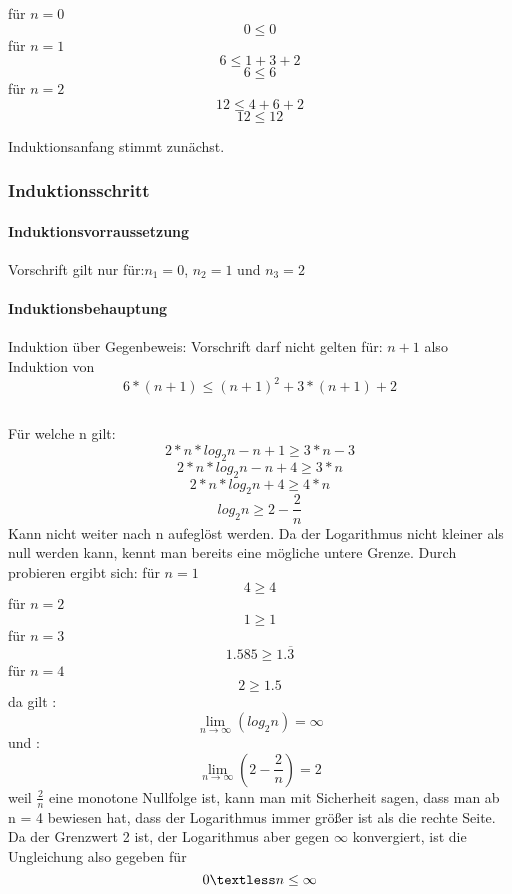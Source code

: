 \documentclass{article}
\begin{document}
für $n=0$
\[0 \le 0\]
für $n=1$
\[6 \le 1+3+2\]
\[ 6 \le 6 \]
\newline
für $n=2$
\[12 \le 4+6+2\]
\[ 12 \le 12 \]
\newline

Induktionsanfang stimmt zunächst.
\subsubsection{Induktionsschritt}
\paragraph{Induktionsvorraussetzung}\mbox{}

Vorschrift gilt nur für:$n_1=0$,  $n_2=1$ und  $n_3=2$

\paragraph{Induktionsbehauptung}\mbox{}
Induktion über Gegenbeweis:
Vorschrift darf nicht gelten für: $n+1$ also Induktion von \[6*(n+1) \le (n+1)^2+3*(n+1)+2\]
\subsection{}
Für welche n gilt:
\[2*n*log_2n-n+1 \geq 3*n-3 \]
\[2*n*log_2n-n+4 \geq 3*n \]
\[2*n*log_2n+4 \geq 4*n \]
\[log_2n \geq 2 - \frac{2}{n} \]
Kann nicht weiter nach n aufeglöst werden. Da der Logarithmus nicht kleiner als null werden kann, kennt man bereits eine
mögliche untere Grenze. Durch probieren ergibt sich:
\newline
für $n=1$ \[4 \geq 4 \]
für $n=2$ \[1 \geq 1 \]
für $n=3$ \[1.585 \geq  1.\overline{3} \]
für $n=4$ \[2 \geq  1.5 \]
da gilt :\[\lim_{n\to\infty}\left(log_2n\right)=\infty\]
und 
:\[\lim_{n\to\infty}\left(2 - \frac{2}{n}\right)=2 \] 
weil $\frac{2}{n}$ eine monotone Nullfolge ist, kann man mit Sicherheit sagen, dass man ab n = 4 bewiesen hat, dass der Logarithmus immer größer ist als die rechte Seite. Da der Grenzwert 2 ist, der Logarithmus aber gegen $\infty$ konvergiert, ist die Ungleichung also gegeben für \[ 0 \textless n \le \infty \]
\end{document}
